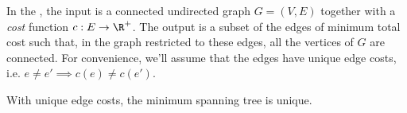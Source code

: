 \begin{definition}
\label{definition:Minimum-spanning-tree-MST-problem} 
In the , the input is a connected undirected graph $G = (V,E)$ together with a \emph{cost} function $c : E \to \R^+$. The output is a subset of the edges of minimum total cost such that, in the graph restricted to these edges, all the vertices of $G$ are connected. For convenience, we'll assume that the edges have unique edge costs, i.e. $e \neq e' \implies c(e) \neq c(e')$.

\end{definition}

\begin{note}
\label{note:Unique-edges-costs-imply-unique-MST}
With unique edge costs, the minimum spanning tree is unique.

\end{note}

